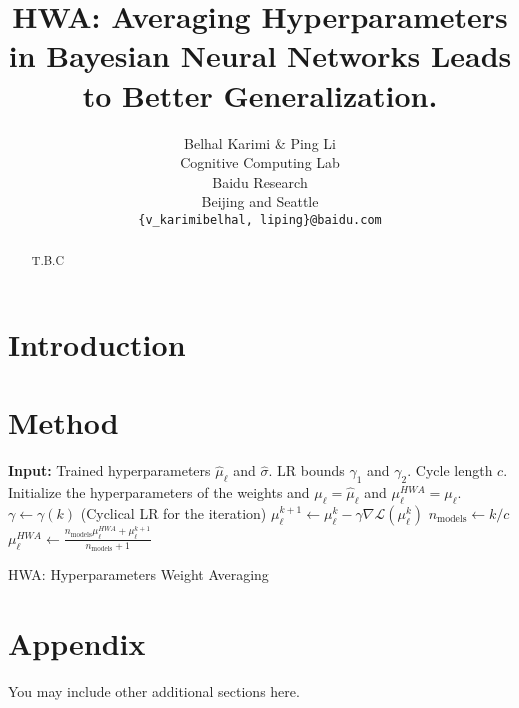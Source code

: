 \documentclass{article} %
\title{HWA: Averaging Hyperparameters in Bayesian Neural Networks Leads to Better Generalization.}
\author{Belhal Karimi \& Ping Li \\
Cognitive Computing Lab\\
Baidu Research\\
Beijing and Seattle \\
\texttt{\{v_karimibelhal, liping\}@baidu.com} \\
}
\begin{document}
\maketitle

\begin{abstract}
T.B.C
\end{abstract}

\section{Introduction}

\section{Method}

\begin{algorithm}[H]
\begin{algorithmic}[1]
\STATE \textbf{Input:} Trained hyperparameters $\hat{\mu}_{\ell}$ and $\hat{\sigma}$. LR bounds $\gamma_1$ and $\gamma_2$. Cycle length $c$.
\STATE Initialize the hyperparameters of the weights and 
$\mu_{\ell} = \hat{\mu}_{\ell}$ and $\mu^{HWA}_{\ell} = \mu_{\ell}$.
\STATE $\gamma \leftarrow \gamma(k)$ (Cyclical LR for the iteration)
\STATE $\mu_{\ell}^{k+1} \leftarrow \mu_{\ell}^{k} - \gamma \nabla \mathcal{L}(\mu_{\ell}^{k})$
	\STATE $n_{\textrm{models}} \leftarrow k/c$
		\STATE $\mu_{\ell}^{HWA} \leftarrow \frac{n_{\textrm{models}}\mu_{\ell}^{HWA} + \mu_{\ell}^{k+1}}{n_{\textrm{models}}+1}$
\ENDIF
\ENDFOR
\end{algorithmic}
\caption{HWA: Hyperparameters Weight Averaging}
\label{alg:miso}
        \end{algorithm}


\newpage




\appendix
\section{Appendix}
You may include other additional sections here. 
\end{document}

